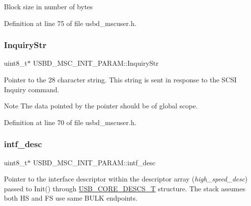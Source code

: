 Block size in number of bytes 

Definition at line 75 of file usbd\+\_\+mscuser.\+h.

\mbox{\label{struct_u_s_b_d___m_s_c___i_n_i_t___p_a_r_a_m_a84e110f5e1d448f9c35e9e8583429df8}} 
\subsubsection{\texorpdfstring{Inquiry\+Str}{InquiryStr}}
{\footnotesize\ttfamily uint8\+\_\+t$\ast$ U\+S\+B\+D\+\_\+\+M\+S\+C\+\_\+\+I\+N\+I\+T\+\_\+\+P\+A\+R\+A\+M\+::\+Inquiry\+Str}

Pointer to the 28 character string. This string is sent in response to the S\+C\+SI Inquiry command. \begin{DoxyNote}{Note}
The data pointed by the pointer should be of global scope. 
\end{DoxyNote}


Definition at line 70 of file usbd\+\_\+mscuser.\+h.

\mbox{\label{struct_u_s_b_d___m_s_c___i_n_i_t___p_a_r_a_m_a308fc23cd32876dcdc914d2223f8f7c4}} 
\subsubsection{\texorpdfstring{intf\+\_\+desc}{intf\_desc}}
{\footnotesize\ttfamily uint8\+\_\+t$\ast$ U\+S\+B\+D\+\_\+\+M\+S\+C\+\_\+\+I\+N\+I\+T\+\_\+\+P\+A\+R\+A\+M\+::intf\+\_\+desc}

Pointer to the interface descriptor within the descriptor array ({\itshape high\+\_\+speed\+\_\+desc}) passed to Init() through \hyperlink{group___u_s_b_d___core_gabdc617d119eac0555f91bea957c41ecc}{U\+S\+B\+\_\+\+C\+O\+R\+E\+\_\+\+D\+E\+S\+C\+S\+\_\+T} structure. The stack assumes both HS and FS use same B\+U\+LK endpoints. 

